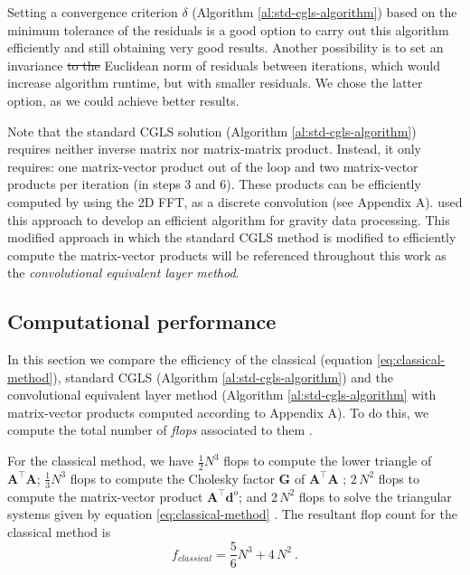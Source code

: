 \documentclass[manuscript]{geophysics}
\providecommand{\DIFaddtex}[1]{{\protect\color{blue}\uwave{#1}}} %
\providecommand{\DIFdeltex}[1]{{\protect\color{red}\sout{#1}}}                      %
\providecommand{\DIFaddbegin}{} %
\providecommand{\DIFaddend}{} %
\providecommand{\DIFdelbegin}{} %
\providecommand{\DIFdelend}{} %
\providecommand{\DIFadd}[1]{\texorpdfstring{\DIFaddtex{#1}}{#1}} %
\providecommand{\DIFdel}[1]{\texorpdfstring{\DIFdeltex{#1}}{}} %
\begin{document}
Setting a convergence criterion $\delta$ (Algorithm \ref{al:std-cgls-algorithm}) based on the minimum tolerance 
of the residuals is a good option to carry out this algorithm efficiently and still obtaining very good results. 
Another possibility is to set an invariance \DIFdelbegin \DIFdel{to the }\DIFdelend \DIFaddbegin \DIFadd{limit to the normalized }\DIFaddend Euclidean norm of residuals between iterations,
which would increase algorithm runtime, but with smaller residuals. 
We chose the latter option, as we could achieve better results.

Note that the standard CGLS solution (Algorithm \ref{al:std-cgls-algorithm}) requires 
neither inverse matrix nor matrix-matrix product. Instead, it only requires: one matrix-vector 
product out of the loop and two matrix-vector products per iteration (in steps 3 and 6). 
These products can be efficiently computed by using the 2D FFT, as a discrete convolution
(see Appendix A). \citet{takahashi2020convolutional} used this approach
to develop an efficient algorithm for gravity data processing. This modified approach in which
the standard CGLS method is modified to efficiently compute the matrix-vector products will be 
referenced throughout this work as the \textit{convolutional equivalent layer method}.

\subsection{Computational performance}

In this section we compare the efficiency of the classical (equation \ref{eq:classical-method}), 
standard CGLS (Algorithm \ref{al:std-cgls-algorithm}) and the convolutional equivalent 
layer method (Algorithm \ref{al:std-cgls-algorithm} with matrix-vector products computed 
according to Appendix A). To do this, we compute the total number of 
\textit{flops} associated to them \citep[][ p. 12]{golub-vanloan2013}.

For the classical method, we have $\tfrac{1}{2} N^3$ flops to compute the lower triangle of
$\mathbf{A}^{\top}\mathbf{A}$; $\tfrac{1}{3} N^3$ flops to compute the Cholesky factor
$\mathbf{G}$ of $\mathbf{A}^{\top}\mathbf{A}$ \citep[][ p.~164]{golub-vanloan2013};
$2 \, N^2$ flops to compute the matrix-vector product $\mathbf{A}^{\top} \mathbf{d}^{o}$;
and $2 \, N^2$ flops to solve the triangular systems given by equation \ref{eq:classical-method}
\citep[][ p.~106]{golub-vanloan2013}. The resultant flop count for the classical method is
\begin{equation}
	f_{classical} =  \dfrac{5}{6} N^{3} + 4 \, N^{2}\: .
	\label{eq:flops-classical-method}
\end{equation}
\end{document}
